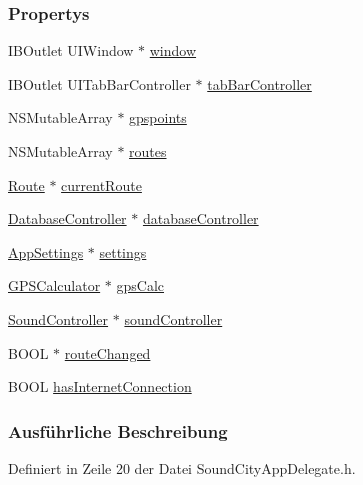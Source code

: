 \subsubsection*{Propertys}
\begin{DoxyCompactItemize}
\item 
IBOutlet UIWindow $\ast$ \hyperlink{interface_sound_city_app_delegate_a2bb7d766b3f7e8c43fad9f7c5050549e}{window}
\item 
IBOutlet UITabBarController $\ast$ \hyperlink{interface_sound_city_app_delegate_abeda0b4bd58fbf9cf62b1641f7fdf31c}{tabBarController}
\item 
NSMutableArray $\ast$ \hyperlink{interface_sound_city_app_delegate_a0edc5a15f6188d5a6a80e6f636690642}{gpspoints}
\item 
NSMutableArray $\ast$ \hyperlink{interface_sound_city_app_delegate_aeac7ef371e675b53b754f6d9d02d183d}{routes}
\item 
\hyperlink{interface_route}{Route} $\ast$ \hyperlink{interface_sound_city_app_delegate_a10dee28d622e01c6acae7df512172b72}{currentRoute}
\item 
\hyperlink{interface_database_controller}{DatabaseController} $\ast$ \hyperlink{interface_sound_city_app_delegate_a692eabf939d719d6fa61205327df9a67}{databaseController}
\item 
\hyperlink{interface_app_settings}{AppSettings} $\ast$ \hyperlink{interface_sound_city_app_delegate_a0e22551289b704c129fd5268ff45c8ad}{settings}
\item 
\hyperlink{interface_g_p_s_calculator}{GPSCalculator} $\ast$ \hyperlink{interface_sound_city_app_delegate_a5a2710c1bcf8b87d74b67d4f536fbf1b}{gpsCalc}
\item 
\hyperlink{interface_sound_controller}{SoundController} $\ast$ \hyperlink{interface_sound_city_app_delegate_a05e1eebd4d2b5cefeb4237ac3c94500b}{soundController}
\item 
BOOL $\ast$ \hyperlink{interface_sound_city_app_delegate_a35c584d369e69d0e25a8f62d713b3747}{routeChanged}
\item 
BOOL \hyperlink{interface_sound_city_app_delegate_a076c894032a8dd5ceec3cd7161071863}{hasInternetConnection}
\end{DoxyCompactItemize}


\subsubsection{Ausführliche Beschreibung}


Definiert in Zeile 20 der Datei SoundCityAppDelegate.h.


